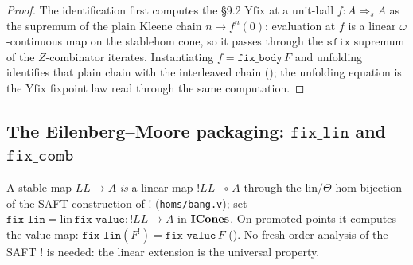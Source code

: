 \begin{proof}
The identification
 first computes
the \S9.2 $\mathrm{Yfix}$ at a unit-ball $f : A \Rightarrow_s A$ as the
supremum of the plain Kleene chain $n \mapsto f^n(0)$: evaluation at
$f$ is a linear $\omega$-continuous map on the stablehom cone, so it
passes through the $\mathtt{sfix}$ supremum of the
$Z$-combinator iterates. Instantiating $f = \mathtt{fix\_body}\,F$ and
unfolding 
identifies that plain chain with the interleaved chain
(); the unfolding
equation  is
the $\mathrm{Yfix}$ fixpoint law
 read through the same
computation.
\end{proof}

\subsection{The Eilenberg--Moore packaging:
$\mathtt{fix\_lin}$ and $\mathtt{fix\_comb}$}%
\label{ssec:cbv-fix-comb}

\begin{definition}%
\label{def:cbv-fix-lin}
\rocqok
{}\rocqok
{}
A stable map $LL \to A$ \emph{is} a linear map
$\mathord{!}LL \multimap A$ through the $\mathrm{lin}/\Theta$
hom-bijection of the SAFT construction of $\mathord{!}$
(\texttt{homs/bang.v}); set
$\mathtt{fix\_lin} = \mathrm{lin}\,\mathtt{fix\_value} :
\mathord{!}LL \to A$ in $\mathbf{ICones}$. On promoted points it computes the
value map: $\mathtt{fix\_lin}(F^!) = \mathtt{fix\_value}\,F$
(). No fresh
order analysis of the SAFT $\mathord{!}$ is needed: the linear
extension is the universal property.
\end{definition}

